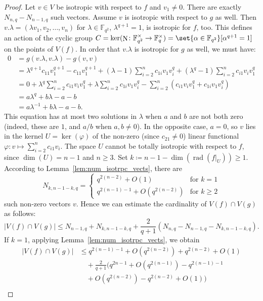 \documentclass[a4paper,11pt]{amsproc}
\newcommand{\card}[1]{\left\lvert#1\right\rvert}%
\newcommand{\finfield}{\mathbb{F}}%
\DeclareMathOperator{\rad}{rad}%
\DeclareMathOperator{\N}{N}%
\newcommand{\rest}[1]{\left.#1\right\rvert}%
\theoremstyle{plain}
\theoremstyle{definition}
\begin{document}
\begin{proof}
		Let $v\in V$ be isotropic with respect to $f$ and $v_1\neq 0$. There are exactly $N_{n,q}-N_{n-1,q}$ such vectors. Assume $v$ is isotropic with respect to $g$ as well. Then $v.\lambda=(\lambda v_1,v_2,\ldots,v_n)$ for $\lambda\in\finfield_{q^2}$, $\lambda^{q+1}=1$, is isotropic for $f$, too. This defines an action of the cyclic group $C=\ker(\N\colon\finfield_{q^2}^\times\to\finfield_q^\times)=\set{\alpha\in\finfield_{q^2}}[\alpha^{q+1}=1]$ on the points of $V(f)$. In order that $v.\lambda$ is isotropic for $g$ as well, we must have:
		\begin{align*}    
			0&=g(v.\lambda,v.\lambda)-g(v,v) \\
			&=\lambda^{q+1}c_{11}v_1^{q+1}-c_{11}v_1^{q+1}+(\lambda-1)\sum_{i=2}^n{ c_{1i} v_1v_i^q}+(\lambda^q-1)\sum_{i=2}^n{c_{i1} v_iv_1^q} \\
			&=0+\lambda^q\sum_{i=2}^n{c_{i1} v_iv_1^q}+\lambda\sum_{i=2}^n{ c_{1i} v_1v_i^q}-\sum_{i=2}^n{(c_{i1} v_iv_1^q+c_{1i} v_1v_i^q)} \\
			&=a\lambda^q+b\lambda-a-b \\
			&=a\lambda^{-1}+b\lambda-a-b.
		\end{align*}
		This equation has at most two solutions in $\lambda$ when $a$ and $b$ are not both zero (indeed, these are $1$, and $a/b$ when $a,b\neq 0$). In the opposite case, $a=0$, so $v$ lies in the kernel $U=\ker(\varphi)$ of the non-zero (since $c_{21}\neq0$) linear functional $\varphi\colon v\mapsto\sum_{i=2}^n{c_{i1} v_i}$. The space $U$ cannot be totally isotropic with respect to $f$, since $\dim(U)=n-1$ and $n\geq3$. Set $k\coloneqq n-1-\dim(\rad(\rest{f}_U))\geq 1$. According to Lemma~\ref{lem:num_isotrpc_vects}, there are 
		$$
		N_{k,n-1-k,q}=
		\begin{cases}
			q^{2(n-2)}+O(1) & \text{for } k=1\\
			q^{2(n-1)-1}+O(q^{2(n-2)}) & \text{for } k\geq2
		\end{cases}
		$$ 
		such non-zero vectors $v$. Hence we can estimate the cardinality of $V(f)\cap V(g)$ as follows:
		$$
		\card{V(f)\cap V(g)}\leq N_{n-1,q}+N_{k,n-1-k,q}+\frac{2}{q+1}(N_{n,q}-N_{n-1,q}-N_{k,n-1-k,q}).
		$$
		If $k=1$, applying Lemma~\ref{lem:num_isotrpc_vects}, we obtain
		\begin{align*}
			\card{V(f)\cap V(g)}
			&\leq q^{2(n-1)-1}+O(q^{2(n-2)})+q^{2(n-2)}+O(1)\\
			&\quad+\frac{2}{q+1}(q^{2n-1}+O(q^{2(n-1)})-q^{2(n-1)-1}\\
			&\quad+O(q^{2(n-2)})-q^{2(n-2)}+O(1))\\

\end{align*}
\end{proof}
\end{document}
